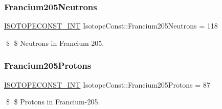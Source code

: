 \subsubsection{\texorpdfstring{Francium205\+Neutrons}{Francium205Neutrons}}
{\footnotesize\ttfamily \mbox{\hyperlink{group___isotope_const-_macros_ga5f18360b3e99483a35c32d789e62621c}{I\+S\+O\+T\+O\+P\+E\+C\+O\+N\+S\+T\+\_\+\+I\+NT}} Isotope\+Const\+::\+Francium205\+Neutrons = 118}

\$ \$ Neutrons in Francium-\/205. \mbox{\label{group___isotope_const-_francium-_fr205_ga247ee0e1988334c1cf9ba4f86c11bb93}} 
\subsubsection{\texorpdfstring{Francium205\+Protons}{Francium205Protons}}
{\footnotesize\ttfamily \mbox{\hyperlink{group___isotope_const-_macros_ga5f18360b3e99483a35c32d789e62621c}{I\+S\+O\+T\+O\+P\+E\+C\+O\+N\+S\+T\+\_\+\+I\+NT}} Isotope\+Const\+::\+Francium205\+Protons = 87}

\$ \$ Protons in Francium-\/205. 